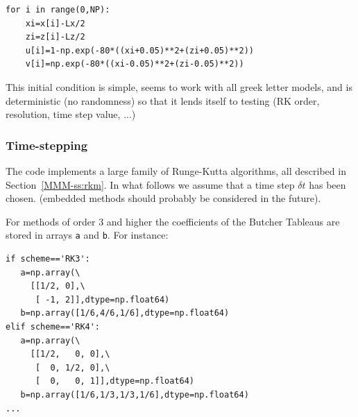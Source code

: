 \begin{itemize}
\begin{lstlisting}
for i in range(0,NP):
    xi=x[i]-Lx/2
    zi=z[i]-Lz/2
    u[i]=1-np.exp(-80*((xi+0.05)**2+(zi+0.05)**2))
    v[i]=np.exp(-80*((xi-0.05)**2+(zi-0.05)**2))
\end{lstlisting}

This initial condition is simple, seems to work with all greek letter models, and is 
deterministic (no randomness) so that it lends itself to testing (RK order, resolution, time step value, ...)

\end{itemize}



\subsubsection*{Time-stepping}


The code implements a large family of Runge-Kutta algorithms, all described in 
Section~\ref{MMM-ss:rkm}.
In what follows we assume that a time step $\delta t$ has been chosen. 
(embedded methods should probably be considered in the future).

For methods of order 3 and higher the coefficients of the Butcher Tableaus
are stored in arrays \lstinline{a} and \lstinline{b}. For instance:

\begin{lstlisting}
if scheme=='RK3': 
   a=np.array(\
     [[1/2, 0],\
      [ -1, 2]],dtype=np.float64)
   b=np.array([1/6,4/6,1/6],dtype=np.float64)
elif scheme=='RK4':
   a=np.array(\
     [[1/2,   0, 0],\
      [  0, 1/2, 0],\
      [  0,   0, 1]],dtype=np.float64)
   b=np.array([1/6,1/3,1/3,1/6],dtype=np.float64)
...
\end{lstlisting}


